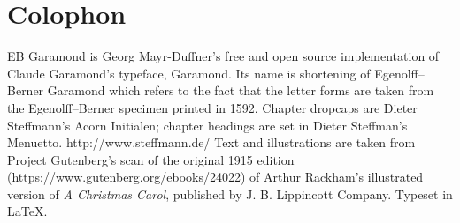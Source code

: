 \documentclass[paper=5.5in:8.5in,BCOR=10mm,twoside,DIV=15,12pt,usegeometry,openany]{scrbook} %
\begin{document}
\chapter*{Colophon}
\pagestyle{empty}
\centering
EB Garamond is Georg Mayr-Duffner's free and open source implementation of Claude Garamond’s typeface, Garamond. Its name is shortening of Egenolff–Berner Garamond which refers to the fact that the letter forms are taken from the Egenolff–Berner specimen printed in 1592.
\vfill
Chapter dropcaps are Dieter Steffmann's Acorn Initialen; chapter headings are set in Dieter Steffman's Menuetto. http://www.steffmann.de/ 
\vfill
Text and illustrations are taken from Project Gutenberg's scan of the original 1915 edition (https://www.gutenberg.org/ebooks/24022) of Arthur Rackham's illustrated version of \textit{A Christmas Carol}, published by J. B. Lippincott Company.
\vfill
Typeset in \LaTeX{}.
\end{document}
